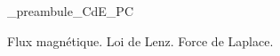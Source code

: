 



\ifdefined\mainIsLoaded\else
\RequirePackage{import}
{_preambule_CdE_PC}

\fi







\debutFicheEntrainement                                                                      %




\begin{prerequis}
	Flux magnétique. Loi de Lenz. Force de Laplace.
\end{prerequis}






